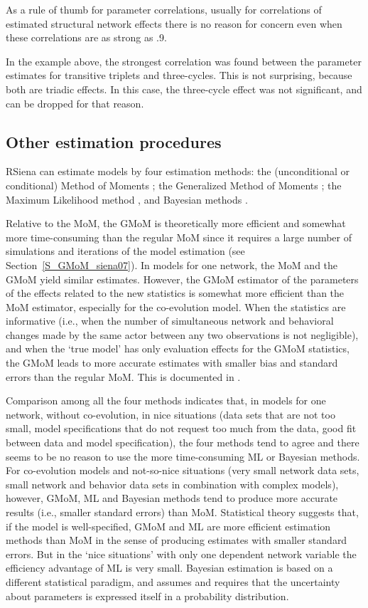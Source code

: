 \documentclass[a4paper,fleqn,11pt]{article}
\newcommand{\+}{\, + \,}
\newcommand{\RS}{{\sf \textsf{RSiena} }}
\begin{document}
As a rule of thumb for parameter correlations,
usually for correlations of estimated structural network effects there is no
reason for concern even when these correlations
are as strong as .9.

In the example above, the strongest correlation was found between
the parameter estimates for transitive triplets and three-cycles.
This is not surprising, because both are triadic effects.
In this case, the three-cycle effect was not significant,
and can be dropped for that reason.

\subsection{Other estimation procedures}

\RS can estimate models by four estimation methods:
the (unconditional or conditional)
Method of Moments \citep*[`MoM', the default; ][]{Snijders01, SnijdersEA07};
the Generalized Method of Moments \citep*[`GMoM', see][]{ASS2015,ASS2019};
the Maximum Likelihood method \citep*[`ML', see][]{SnijdersEA10a},
and Bayesian methods
\citep[see][]{Koskinen04,KoskinenSnijders07,SchweinbergerSnijders07c,KoskinenSnijders2023}.


Relative to the MoM, the GMoM is theoretically more efficient and somewhat more time-consuming
than the regular MoM since it requires a large number of simulations and
iterations of the model estimation (see Section~\ref{S_GMoM_siena07}).
In models for one network, the MoM and the GMoM yield similar estimates.
However, the GMoM estimator of the parameters of the effects related to the new statistics
is somewhat more efficient than the MoM estimator, especially for the co-evolution model.
When the statistics are informative (i.e., when the number of simultaneous network
and behavioral changes made by the same actor between any two observations is not negligible),
and when the `true model' has only evaluation effects for the GMoM statistics,
the GMoM leads to more accurate estimates with smaller bias
and standard errors than the regular MoM.
This is documented in \citet{ASS2015,ASS2019}.

Comparison among all the four methods indicates that,
in models for one network, without co-evolution,
in nice situations (data sets that are not too small, model specifications
that do not request too much from the data, good fit between data and
model specification), the four methods tend to agree
and there seems to be no reason to use the more time-consuming
ML or Bayesian methods.
For co-evolution models and not-so-nice situations (very small network data sets,
small network and behavior data sets in combination with complex models),
however, GMoM, ML and Bayesian methods tend to produce more accurate results
(i.e., smaller standard errors) than MoM.
Statistical theory suggests that, if the model is well-specified,
GMoM and ML are more efficient estimation methods
than MoM in the sense of producing estimates with smaller standard errors.
But in the `nice situations'
with only one dependent network variable the efficiency advantage of ML is very small.
Bayesian estimation is based on a different statistical paradigm, and
assumes and requires that the uncertainty about parameters is expressed
itself in a probability distribution.
\end{document}
